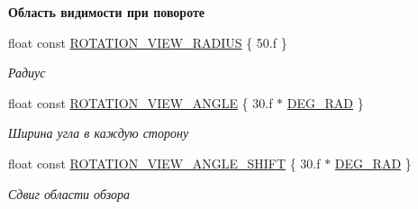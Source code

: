 \begin{Indent}\textbf{ Область видимости при повороте}\par
\begin{DoxyCompactItemize}
\item 
\mbox{\label{namespacertm_ae9ea4dbfd2f4bb3b5c6bf1c5ea7227d7}} 
float const \hyperlink{namespacertm_ae9ea4dbfd2f4bb3b5c6bf1c5ea7227d7}{R\+O\+T\+A\+T\+I\+O\+N\+\_\+\+V\+I\+E\+W\+\_\+\+R\+A\+D\+I\+US} \{ 50.f \}
\begin{DoxyCompactList}\small\item\em Радиус \end{DoxyCompactList}\item 
\mbox{\label{namespacertm_ab5d83fa039813239add636c5dfe1c64d}} 
float const \hyperlink{namespacertm_ab5d83fa039813239add636c5dfe1c64d}{R\+O\+T\+A\+T\+I\+O\+N\+\_\+\+V\+I\+E\+W\+\_\+\+A\+N\+G\+LE} \{ 30.f $\ast$ \hyperlink{namespacertm_a797faf3037681ed7bc153db9eca6155e}{D\+E\+G\+\_\+\+R\+AD} \}
\begin{DoxyCompactList}\small\item\em Ширина угла в каждую сторону \end{DoxyCompactList}\item 
\mbox{\label{namespacertm_ab2e47618aa31260d6890c18525f611fa}} 
float const \hyperlink{namespacertm_ab2e47618aa31260d6890c18525f611fa}{R\+O\+T\+A\+T\+I\+O\+N\+\_\+\+V\+I\+E\+W\+\_\+\+A\+N\+G\+L\+E\+\_\+\+S\+H\+I\+FT} \{ 30.f $\ast$ \hyperlink{namespacertm_a797faf3037681ed7bc153db9eca6155e}{D\+E\+G\+\_\+\+R\+AD} \}
\begin{DoxyCompactList}\small\item\em Сдвиг области обзора \end{DoxyCompactList}\end{DoxyCompactItemize}
\end{Indent}
